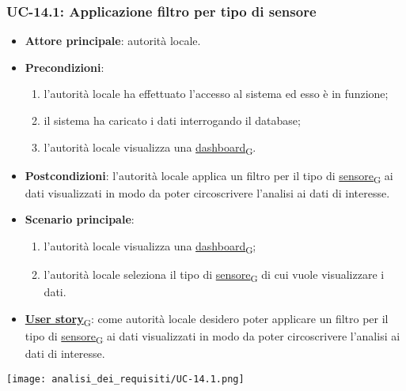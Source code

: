\subsubsection{UC-14.1: Applicazione filtro per tipo di sensore}
\begin{itemize}
	\item \textbf{Attore principale}: autorità locale.
	\item \textbf{Precondizioni}:
	      \begin{enumerate}
		      \item l'autorità locale ha effettuato l'accesso al sistema ed esso è in funzione;
		      \item il sistema ha caricato i dati interrogando il database;
		      \item l'autorità locale visualizza una \href{https://7last.github.io/docs/rtb/documentazione-interna/glossario\#dashboard}{dashboard\textsubscript{G}}.
	      \end{enumerate}
	\item \textbf{Postcondizioni}: l'autorità locale applica un filtro per il tipo di \href{https://7last.github.io/docs/rtb/documentazione-interna/glossario\#sensore}{sensore\textsubscript{G}} ai dati visualizzati in modo da poter circoscrivere l'analisi ai dati di interesse.
	\item \textbf{Scenario principale}:
	      \begin{enumerate}
		      \item l'autorità locale visualizza una \href{https://7last.github.io/docs/rtb/documentazione-interna/glossario\#dashboard}{dashboard\textsubscript{G}};
		      \item l'autorità locale seleziona il tipo di \href{https://7last.github.io/docs/rtb/documentazione-interna/glossario\#sensore}{sensore\textsubscript{G}} di cui vuole visualizzare i dati.
	      \end{enumerate}
	\item \href{https://7last.github.io/docs/rtb/documentazione-interna/glossario\#user-story}{\textbf{User story}\textsubscript{G}}:
	      come autorità locale desidero poter applicare un filtro per il tipo di \href{https://7last.github.io/docs/rtb/documentazione-interna/glossario\#sensore}{sensore\textsubscript{G}} ai dati visualizzati in modo da poter circoscrivere l'analisi ai dati di interesse.
\end{itemize}
\begin{center}
	\texttt{[image: analisi\_dei\_requisiti/UC-14.1.png]}
\end{center}

